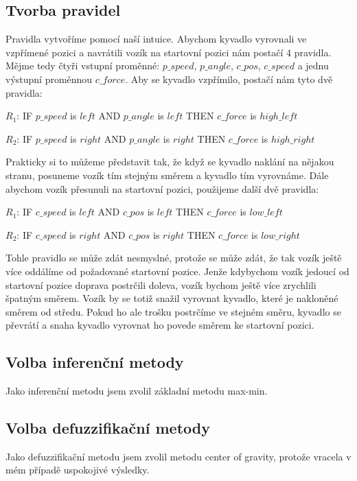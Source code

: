 \documentclass[
  program=inf,
  figures,
  tables,
  glossaries,
  index
]{kidiplom}
\begin{document}
\subsection{Tvorba pravidel}
Pravidla vytvoříme pomocí naší intuice. Abychom kyvadlo vyrovnali ve vzpřímené pozici a navrátili vozík na startovní pozici nám postačí 4 pravidla. Mějme tedy čtyři vstupní proměnné: $p\_speed$, $p\_angle$, $c\_pos$, $c\_speed$ a jednu výstupní proměnnou $c\_force$. Aby se kyvadlo vzpřímilo, postačí nám tyto dvě pravidla:
\begin{flushleft}
$R_{1}$: IF $p\_speed$ is $left$ AND $p\_angle$ is $left$ THEN $c\_force$ is $high\_left$

$R_{2}$: IF $p\_speed$ is $right$ AND $p\_angle$ is $right$ THEN $c\_force$ is $high\_right$ 
\end{flushleft}
Prakticky si to můžeme představit tak, že když se kyvadlo naklání na nějakou stranu, posuneme vozík tím stejným směrem a kyvadlo tím vyrovnáme. Dále abychom vozík přesunuli na startovní pozici, použijeme další dvě pravidla:
\begin{flushleft}
$R_{1}$: IF $c\_speed$ is $left$ AND $c\_pos$ is $left$ THEN $c\_force$ is $low\_left$

$R_{2}$: IF $c\_speed$ is $right$ AND $c\_pos$ is $right$ THEN $c\_force$ is $low\_right$ 
\end{flushleft}
Tohle pravidlo se může zdát nesmyslné, protože se může zdát, že tak vozík ještě více oddálíme od požadované startovní pozice. Jenže kdybychom vozík jedoucí od startovní pozice doprava postrčili doleva, vozík bychom ještě více zrychlili špatným směrem. Vozík by se totiž snažil vyrovnat kyvadlo, které je nakloněné směrem od středu. Pokud ho ale trošku postrčíme ve stejném směru, kyvadlo se převrátí a snaha kyvadlo vyrovnat ho povede směrem ke startovní pozici.
\subsection{Volba inferenční metody}
Jako inferenční metodu jsem zvolil základní metodu max-min.

\subsection{Volba defuzzifikační metody}
Jako defuzzifikační metodu jsem zvolil metodu center of gravity, protože vracela v mém případě uspokojivé výsledky.
\end{document}
